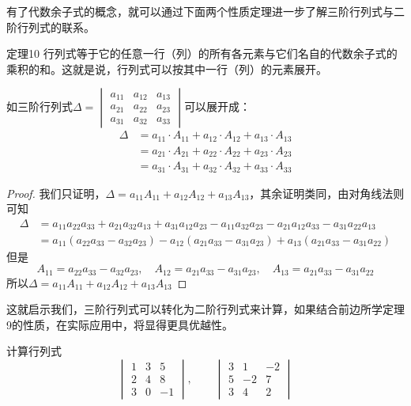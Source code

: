 有了代数余子式的概念，就可以通过下面两个性质定理进一步了解三阶行列式与二阶行列式的联系。

\begin{blk}{定理10}
    行列式等于它的任意一行（列）的所有各元素与它们名自的代数余子式的乘积的和。这就是说，行列式可以按其中一行（列）的元素展开。
    
    如三阶行列式$\Delta=\begin{vmatrix}
        a_{11}&a_{12}&a_{13}\\
        a_{21}&a_{22}&a_{23}\\
        a_{31}&a_{32}&a_{33}
    \end{vmatrix}$可以展开成：
\[\begin{split}
    \Delta &= a_{11}\cdot A_{11}+a_{12}\cdot A_{12}+a_{13}\cdot A_{13}\\
    &= a_{21}\cdot A_{21}+a_{22}\cdot A_{22}+a_{23}\cdot A_{23}\\
    &= a_{31}\cdot A_{31}
    +a_{32}\cdot A_{32}+a_{33}\cdot A_{33}
\end{split}\]
\end{blk}

\begin{proof}
我们只证明，$\Delta =a_{11}A_{11}+a_{12} A_{12}+a_{13} A_{13}$，其余证明类同，由对角线法则可知
\[\begin{split}
\Delta &=a_{11}a_{22}a_{33}+a_{21}a_{32}a_{13}+a_{31}a_{12}a_{23}-a_{11}a_{32}a_{23}-a_{21}a_{12}a_{33}-a_{31}a_{22}a_{13}\\
&=a_{11}(a_{22}a_{33}-a_{32}a_{23})-a_{12}(a_{21}a_{33}-a_{31}a_{23})+a_{13}(a_{21}a_{33}-a_{31}a_{22})
\end{split}\]
但是
\[A_{11}=a_{22}a_{33}-a_{32}a_{23},\quad A_{12}=a_{21}a_{33}-a_{31}a_{23},\quad A_{13}=a_{21}a_{33}-a_{31}a_{22}\]
所以$\Delta =a_{11}A_{11}+a_{12} A_{12}+a_{13} A_{13}$
\end{proof}

这就启示我们，三阶行列式可以转化为二阶行列式来计算，如果结合前边所学定理9的性质，在实际应用中，将显得更具优越性。

\begin{example}
    计算行列式
\[\begin{vmatrix}
    1&3&5\\2&4&8\\3&0&-1
\end{vmatrix},\qquad \begin{vmatrix}
    3&1&-2\\5&-2&7\\3&4&2
\end{vmatrix}\]
\end{example}



